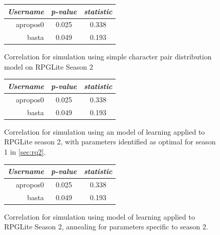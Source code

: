 \begin{figure}[h]
  \centering
  
  \begin{minipage}{.45\textwidth}
  \centering
  \begin{tabular}{r|c|c}
    \emph{Username} & \emph{p-value} & \emph{\tau{} statistic} \\\hline\hline
    apropos0 & 0.025 & 0.338 \\
    basta & 0.049 & 0.193 \\
  \end{tabular}
  \caption{Correlation for simulation using simple character pair distribution model on RPGLite Season 2}
  \label{prior_distribution_model_results_s2}
  \end{minipage}\hfill
  \begin{minipage}{.45\textwidth}
  \centering
  \begin{tabular}{r|c|c}
    \emph{Username} & \emph{p-value} & \emph{\tau{} statistic} \\\hline\hline
    apropos0 & 0.025 & 0.338 \\
    basta & 0.049 & 0.193 \\
  \end{tabular}
  \caption{Correlation for simulation using an \aspectoriented{} model of learning
  applied to RPGLite season 2, with parameters identified as optimal for season 1
  in
  \cref{sec:rq2}.}
  \label{learning_model_results_s2_old_parameters}
  \end{minipage}
  \begin{minipage}{.45\textwidth}
  \centering
  \begin{tabular}{r|c|c}
    \emph{Username} & \emph{p-value} & \emph{\tau{} statistic} \\\hline\hline
    apropos0 & 0.025 & 0.338 \\
    basta & 0.049 & 0.193 \\
  \end{tabular}
  \caption{Correlation for simulation using \aspectoriented{} model of learning applied to RPGLite Season 2, annealing for parameters specific to season 2.}
  \label{learning_model_results_s2_annealed_parameters}
  \end{minipage}
  

\end{figure}


